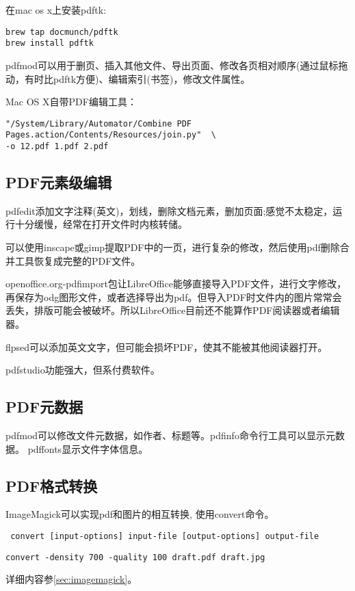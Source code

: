 在mac os x上安装pdftk:
\begin{verbatim}
brew tap docmunch/pdftk
brew install pdftk
\end{verbatim}

pdfmod可以用于删页、插入其他文件、导出页面、修改各页相对顺序(通过鼠标拖动，有时比pdftk方便)、编辑索引(书签)，修改文件属性。

Mac OS X自带PDF编辑工具：
\begin{verbatim}
"/System/Library/Automator/Combine PDF Pages.action/Contents/Resources/join.py"  \
-o 12.pdf 1.pdf 2.pdf
\end{verbatim}


\subsection{PDF元素级编辑}
pdfedit添加文字注释(英文)，划线，删除文档元素，删加页面;感觉不太稳定，运行十分缓慢，经常在打开文件时内核转储。

可以使用inscape或gimp提取PDF中的一页，进行复杂的修改，然后使用pdf删除合并工具恢复成完整的PDF文件。

openoffice.org-pdfimport包让LibreOffice能够直接导入PDF文件，进行文字修改，再保存为odg图形文件，或者选择导出为pdf。但导入PDF时文件内的图片常常会丢失，排版可能会被破坏。所以LibreOffice目前还不能算作PDF阅读器或者编辑器。

flpsed可以添加英文文字，但可能会损坏PDF，使其不能被其他阅读器打开。

pdfstudio功能强大，但系付费软件。

\subsection{PDF元数据}
pdfmod可以修改文件元数据，如作者、标题等。pdfinfo命令行工具可以显示元数据。
pdffonts显示文件字体信息。

\subsection{PDF格式转换}
ImageMagick可以实现pdf和图片的相互转换, 使用convert命令。
\begin{verbatim}
 convert [input-options] input-file [output-options] output-file
\end{verbatim}

\begin{verbatim}
convert -density 700 -quality 100 draft.pdf draft.jpg
\end{verbatim}
详细内容参\ref{sec:imagemagick}。

